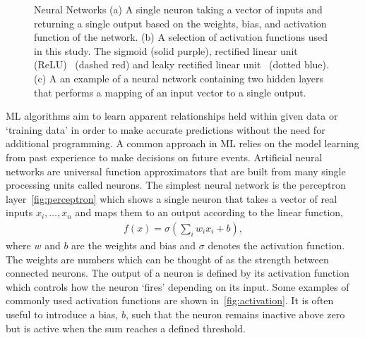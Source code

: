 \documentclass[12pt]{iopart}
\newcommand{\jordan}[1]{\textbf{\textcolor{red}{JORDAN: #1}}}
\newcommand{\chris}[1]{\textbf{\textcolor{green}{CHRIS: #1}}}
\begin{document}
\begin{figure}[h!]
\caption{Neural Networks (a) A single neuron taking a vector of inputs and
returning a single output based on the weights, bias, and activation function
of the network. (b) A selection of activation functions used in this study. The sigmoid (solid purple), rectified linear unit (ReLU)~\cite{relu} (dashed red) and leaky rectified linear unit~\cite{Maas2013RectifierNI} (dotted blue). (c) A an example of a neural network containing two hidden layers that performs a mapping of an input vector to a single output.}
\end{figure}
%
%

\ac{ML} algorithms aim to learn apparent relationships held within given data or `training
data' in order to make accurate predictions without the need for additional
programming. A common approach in \ac{ML} relies on the model learning from
past experience to make decisions on future events. Artificial neural networks are universal function approximators that are built from many single
processing units called neurons. The simplest neural network is the perceptron
layer~\cref{fig:perceptron} which shows a single neuron that takes a vector of real
inputs $x_{i},\ldots, x_{n}$
and maps them to an output according to the linear function, 
%
\begin{align}
f(x) = \sigma\left(\sum_i w_i x_i + b\right),
\label{eqn:neuron}
\end{align}
%
where $w$ and $b$ are the weights and bias and $\sigma$ denotes the activation function. The weights are numbers which can be thought of as the strength between connected neurons. The output of a neuron is defined by its activation function which controls how the neuron `fires' depending on its input. Some examples of commonly used activation functions are shown in~\cref{fig:activation}. It is often useful to introduce a bias, $b$, such that the neuron remains inactive above zero but is active when the sum reaches a defined threshold. 
\end{document}
